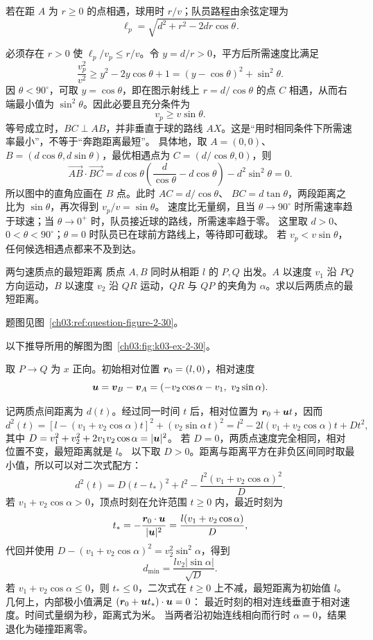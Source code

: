 {\begin{xesolution}
若在距 $A$ 为 $r\ge0$ 的点相遇，球用时 $r/v$；队员路程由余弦定理为
\[
\ell_p=\sqrt{d^2+r^2-2dr\cos\theta}.
\]
\FootballInterceptionDiagram

必须存在 $r>0$ 使 $\ell_p/v_p\le r/v$。令 $y=d/r>0$，平方后所需速度比满足
\[
\frac{v_p^2}{v^2}\ge y^2-2y\cos\theta+1
=(y-\cos\theta)^2+\sin^2\theta.
\]
因 $\theta<90^\circ$，可取 $y=\cos\theta$，即在图示射线上 $r=d/\cos\theta$ 的点 $C$ 相遇，从而右端最小值为 $\sin^2\theta$。因此必要且充分条件为
\[
  \boxed{v_p\ge v\sin\theta}.
\]
等号成立时，$BC\perp AB$，并非垂直于球的路线 $AX$。这是“用时相同条件下所需速率最小”，不等于“奔跑距离最短”。
具体地，取 $A=(0,0)$、$B=(d\cos\theta,d\sin\theta)$，最优相遇点为 $C=(d/\cos\theta,0)$，则
\[
 \overrightarrow{AB}\cdot\overrightarrow{BC}
 =d\cos\theta\left(\frac d{\cos\theta}-d\cos\theta\right)
   -d^2\sin^2\theta=0.
\]
所以图中的直角应画在 $B$ 点。此时 $AC=d/\cos\theta$、
$BC=d\tan\theta$，两段距离之比为 $\sin\theta$，再次得到 $v_p/v=\sin\theta$。
速度比无量纲，且当 $\theta\to90^\circ$ 时所需速率趋于球速；当 $\theta\to0^+$ 时，队员接近球的路线，所需速率趋于零。
这里取 $d>0$、$0<\theta<90^\circ$；$\theta=0$ 时队员已在球前方路线上，等待即可截球。
若 $v_p<v\sin\theta$，任何候选相遇点都来不及到达。
\end{xesolution}

\begin{origexamplebox}{两匀速质点的最短距离}\label{ch03:ex:k03-2-30}
质点 $A,B$ 同时从相距 $l$ 的 $P,Q$ 出发。$A$ 以速度 $v_1$ 沿 $PQ$ 方向运动，$B$ 以速度 $v_2$ 沿 $QR$ 运动，$QR$ 与 $QP$ 的夹角为 $\alpha$。求以后两质点的最短距离。
\par 题图见图~\ref{ch03:ref:question-figure-2-30}。
\KQuestionBE
\end{origexamplebox}
\begin{xesolution}
以下推导所用的解图为图~\ref{ch03:fig:k03-ex-2-30}。

取 $P\to Q$ 为 $x$ 正向。初始相对位置 $\bm{r}_0=(l,0)$，相对速度
\[
\bm{u}=\bm{v}_B-\bm{v}_A=(-v_2\cos\alpha-v_1,\ v_2\sin\alpha).
\]
\TwoParticlesMinimumDistanceDiagram

记两质点间距离为 $d(t)$。经过同一时间 $t$ 后，相对位置为 $\bm{r}_0+\bm{u}t$，因而
\[
 d^2(t)=[l-(v_1+v_2\cos\alpha)t]^2+(v_2\sin\alpha\,t)^2
 =l^2-2l(v_1+v_2\cos\alpha)t+Dt^2,
\]
其中 $D=v_1^2+v_2^2+2v_1v_2\cos\alpha=|\bm{u}|^2$。
若 $D=0$，两质点速度完全相同，相对位置不变，最短距离就是 $l$。
以下取 $D>0$。距离与距离平方在非负区间同时取最小值，所以可以对二次式配方：
\[
 d^2(t)=D(t-t_*)^2+l^2-\frac{l^2(v_1+v_2\cos\alpha)^2}{D}.
\]
若 $v_1+v_2\cos\alpha>0$，顶点时刻在允许范围 $t\ge0$ 内，最近时刻为
\[
t_*=-\frac{\bm{r}_0\cdot\bm{u}}{|\bm{u}|^2}
=\frac{l(v_1+v_2\cos\alpha)}{D},
\]
代回并使用
$D-(v_1+v_2\cos\alpha)^2=v_2^2\sin^2\alpha$，得到
\[
\boxed{d_{\min}=\frac{lv_2|\sin\alpha|}{\sqrt D}}.
\]
若 $v_1+v_2\cos\alpha\le0$，则 $t_*\le0$，二次式在 $t\ge0$ 上不减，最短距离为初始值 $\boxed l$。
几何上，内部极小值满足 $(\bm{r}_0+\bm{u}t_*)\cdot\bm{u}=0$：
最近时刻的相对连线垂直于相对速度。时间式量纲为秒，距离式为米。
当两者沿初始连线相向而行时 $\alpha=0$，结果退化为碰撞距离零。
\end{xesolution}

}
